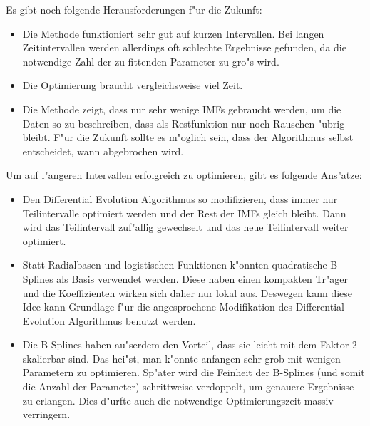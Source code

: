 \documentclass[a4paper]{scrartcl}
\begin{document}
Es gibt noch folgende Herausforderungen f"ur die Zukunft:
\begin{itemize}
\item Die Methode funktioniert sehr gut auf kurzen Intervallen. 
Bei langen Zeitintervallen werden allerdings oft schlechte Ergebnisse gefunden, da die notwendige Zahl der zu fittenden Parameter zu gro"s wird. 
\item Die Optimierung braucht vergleichsweise viel Zeit.
\item Die Methode zeigt, dass nur sehr wenige IMFs gebraucht werden, um die Daten so zu beschreiben, dass als Restfunktion nur noch Rauschen "ubrig bleibt. 
F"ur die Zukunft sollte es m"oglich sein, dass der Algorithmus selbst entscheidet, wann abgebrochen wird. 
\end{itemize}
Um auf l"angeren Intervallen erfolgreich zu optimieren, gibt es folgende Ans"atze:
\begin{itemize}
\item Den Differential Evolution Algorithmus so modifizieren, dass immer nur Teilintervalle optimiert werden und der Rest der IMFs gleich bleibt. 
  Dann wird das Teilintervall zuf"allig gewechselt und das neue Teilintervall weiter optimiert. 
\item Statt Radialbasen und logistischen Funktionen k"onnten quadratische B-Splines als Basis verwendet werden. 
  Diese haben einen kompakten Tr"ager und die Koeffizienten wirken sich daher nur lokal aus. 
Deswegen kann diese Idee kann Grundlage f"ur die angesprochene Modifikation des Differential Evolution Algorithmus benutzt werden. 
\item Die B-Splines haben au"serdem den Vorteil, dass sie leicht mit dem Faktor 2 skalierbar sind. 
  Das hei"st, man k"onnte anfangen sehr grob mit wenigen Parametern zu optimieren. 
  Sp"ater wird die Feinheit der B-Splines (und somit die Anzahl der Parameter) schrittweise verdoppelt, um genauere Ergebnisse zu erlangen. 
  Dies d"urfte auch die notwendige Optimierungszeit massiv verringern. 
\end{itemize}




%





\end{document}
